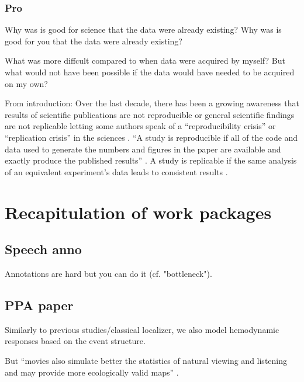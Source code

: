\subsubsection{Pro}
%
Why was is good for science that the data were already existing?
%
Why was is good for you that the data were already existing?

%
What was more diffcult compared to when data were acquired by myself?
%
But what would not have been possible if the data would have needed to be
acquired on my own?

From introduction:
Over the last decade, there has been a growing awareness that results of
scientific publications are not reproducible or general scientific findings are
not replicable letting some authors speak of a ``reproducibility crisis'' or
``replication crisis'' in the sciences \citep{baker2016reproducibility,
plesser2018reproducibility, stupple2019reproducibility, nosek2022replicability}.
``A study is reproducible if all of the code and data used to generate the
numbers and figures in the paper are available and exactly produce the published
results'' \citep{leek2017most}.
A study is replicable if the same analysis of an equivalent experiment's data
leads to consistent results \citep{dubois2016building, leek2017most}.



\section{Recapitulation of work packages}


\subsection{Speech anno}

Annotations are hard but you can do it (cf. "bottleneck").


\subsection{PPA paper}
%
Similarly to previous studies/classical localizer, we also model hemodynamic
responses based on the event structure.

%
But ``movies also simulate better the statistics of natural viewing and
listening and may provide more ecologically valid maps''
\citep{jiahui2020predicting}.

